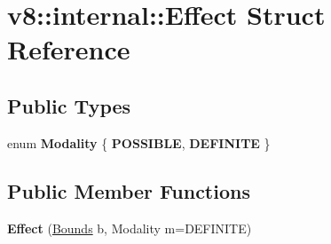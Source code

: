 \hypertarget{structv8_1_1internal_1_1_effect}{}\section{v8\+:\+:internal\+:\+:Effect Struct Reference}
\label{structv8_1_1internal_1_1_effect}
\subsection*{Public Types}
\begin{DoxyCompactItemize}
\item 
\hypertarget{structv8_1_1internal_1_1_effect_a7aef27ba32afed47786abc4e2256a4ca}{}enum {\bfseries Modality} \{ {\bfseries P\+O\+S\+S\+I\+B\+L\+E}, 
{\bfseries D\+E\+F\+I\+N\+I\+T\+E}
 \}\label{structv8_1_1internal_1_1_effect_a7aef27ba32afed47786abc4e2256a4ca}

\end{DoxyCompactItemize}
\subsection*{Public Member Functions}
\begin{DoxyCompactItemize}
\item 
\hypertarget{structv8_1_1internal_1_1_effect_a7fed26ff89a13353eae5d9cbdc15f76b}{}{\bfseries Effect} (\hyperlink{structv8_1_1internal_1_1_bounds_impl}{Bounds} b, Modality m=D\+E\+F\+I\+N\+I\+T\+E)\label{structv8_1_1internal_1_1_effect_a7fed26ff89a13353eae5d9cbdc15f76b}

\end{DoxyCompactItemize}
